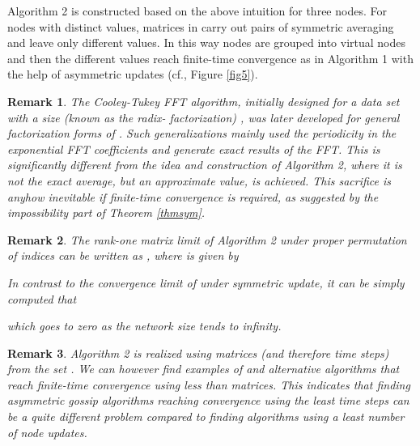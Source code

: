 \documentclass[a4paper, 11pt]{article}
\newtheorem{remark}{Remark}
\begin{document}
Algorithm 2 is constructed based on the above intuition for three nodes. For  nodes with distinct values, matrices in  carry out  pairs of symmetric averaging and leave only  different values. In this way  nodes are grouped into  virtual nodes and then the  different values reach finite-time convergence as in Algorithm 1 with the help of asymmetric updates (cf., Figure \ref{fig5}).

{
\begin{remark}
The  Cooley-Tukey  FFT algorithm, initially designed for a data set with a size  (known as the radix- factorization) \cite{butterfly}, was later developed for general factorization forms of  \cite{IDFT,FFTbook}. Such generalizations mainly used the periodicity in the exponential FFT coefficients  and generate  exact results of the FFT. This is significantly different from the idea and construction of  Algorithm 2, where it is not the exact average, but an approximate value,  is achieved. This sacrifice is anyhow inevitable if finite-time convergence is required, as suggested by the impossibility part of Theorem \ref{thmsym}.
\end{remark}
}

\begin{remark}
The rank-one matrix limit of Algorithm 2 under proper  permutation of indices can be written as , where  is given by

In contrast to the convergence limit of  under symmetric update, it can be simply computed that

which goes to zero as the network size tends to infinity.
\end{remark}

\begin{remark}
Algorithm 2 is realized using   matrices (and therefore  time steps) from the set . We can however find examples of  and alternative algorithms that reach finite-time convergence using less than  matrices. This indicates that finding asymmetric  gossip algorithms reaching  convergence using the least time steps can be a quite different problem compared to finding algorithms using a least number of node updates.
\end{remark}
\end{document}
